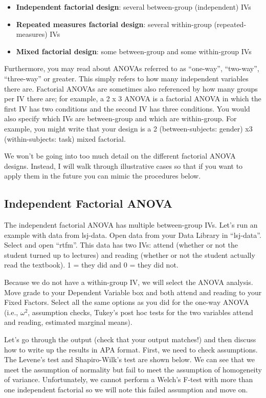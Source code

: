 \documentclass[
]{book}
\providecommand{\tightlist}{%
  \setlength{\itemsep}{0pt}\setlength{\parskip}{0pt}}
\begin{document}
\begin{itemize}
\tightlist
\item
  \textbf{Independent factorial design}: several between-group (independent) IVs
\item
  \textbf{Repeated measures factorial design}: several within-group (repeated-measures) IVs
\item
  \textbf{Mixed factorial design}: some between-group and some within-group IVs
\end{itemize}

Furthermore, you may read about ANOVAs referred to as ``one-way'', ``two-way'', ``three-way'' or greater. This simply refers to how many independent variables there are. Factorial ANOVAs are sometimes also referenced by how many groups per IV there are; for example, a 2 x 3 ANOVA is a factorial ANOVA in which the first IV has two conditions and the second IV has three conditions. You would also specify which IVs are between-group and which are within-group. For example, you might write that your design is a 2 (between-subjects: gender) x3 (within-subjects: task) mixed factorial.

We won't be going into too much detail on the different factorial ANOVA designs. Instead, I will walk through illustrative cases so that if you want to apply them in the future you can mimic the procedures below.

\hypertarget{independent-factorial-anova}{%
\subsection{Independent Factorial ANOVA}\label{independent-factorial-anova}}

The independent factorial ANOVA has multiple between-group IVs. Let's run an example with data from lsj-data. Open data from your Data Library in ``lsj-data''. Select and open ``rtfm''. This data has two IVs: attend (whether or not the student turned up to lectures) and reading (whether or not the student actually read the textbook). 1 = they did and 0 = they did not.

Because we do not have a within-group IV, we will select the ANOVA analysis. Move grade to your Dependent Variable box and both attend and reading to your Fixed Factors. Select all the same options as you did for the one-way ANOVA (i.e., \(\omega^2\), assumption checks, Tukey's post hoc tests for the two variables attend and reading, estimated marginal means).

Let's go through the output (check that your output matches!) and then discuss how to write up the results in APA format. First, we need to check assumptions. The Levene's test and Shapiro-Wilk's test are shown below. We can see that we meet the assumption of normality but fail to meet the assumption of homogeneity of variance. Unfortunately, we cannot perform a Welch's F-test with more than one independent factorial so we will note this failed assumption and move on.
\end{document}
